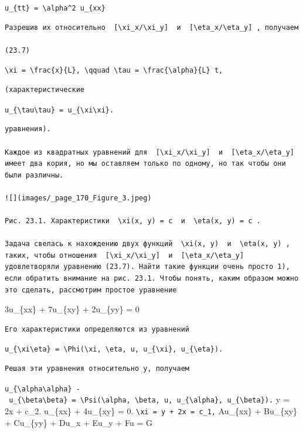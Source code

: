 \documentclass[
  ukrainian,
]{article}
\begin{document}
\texttt{u\_\{tt\}\ =\ \textbackslash{}alpha\^{}2\ u\_\{xx\}}

\begin{verbatim}
Разрешив их относительно  [\xi_x/\xi_y]  и  [\eta_x/\eta_y] , получаем

(23.7)
\end{verbatim}

\texttt{\textbackslash{}xi\ =\ \textbackslash{}frac\{x\}\{L\},\ \textbackslash{}qquad\ \textbackslash{}tau\ =\ \textbackslash{}frac\{\textbackslash{}alpha\}\{L\}\ t,}

\begin{verbatim}
(характеристические
\end{verbatim}

\texttt{u\_\{\textbackslash{}tau\textbackslash{}tau\}\ =\ u\_\{\textbackslash{}xi\textbackslash{}xi\}.}

\begin{verbatim}
уравнения).

Kaждое из квадратных уравнений для  [\xi_x/\xi_y]  и  [\eta_x/\eta_y]  имеет два кория, но мы оставляем только по одному, но так чтобы они были различны.

![](images/_page_170_Figure_3.jpeg)

Рис. 23.1. Характеристики  \xi(x, y) = c  и  \eta(x, y) = c .

Задача свелась к нахождению двух функций  \xi(x, y)  и  \eta(x, y) , таких, чтобы отношения  [\xi_x/\xi_y]  и  [\eta_x/\eta_y]  удовлетворяли уравнению (23.7). Найти такие функции очень просто 1), если обратить внимание на рис. 23.1. Чтобы понять, каким образом можно это сделать, рассмотрим простое уравнение
\end{verbatim}

3u\_\{xx\} + 7u\_\{xy\} + 2u\_\{yy\} = 0

\begin{verbatim}
Его характеристики определяются из уравнений
\end{verbatim}

\texttt{u\_\{\textbackslash{}xi\textbackslash{}eta\}\ =\ \textbackslash{}Phi(\textbackslash{}xi,\ \textbackslash{}eta,\ u,\ u\_\{\textbackslash{}xi\},\ u\_\{\textbackslash{}eta\}).}

\begin{verbatim}
Решая эти уравнения относительно у, получаем
\end{verbatim}

\texttt{u\_\{\textbackslash{}alpha\textbackslash{}alpha\}\ -\ u\_\{\textbackslash{}beta\textbackslash{}beta\}\ =\ \textbackslash{}Psi(\textbackslash{}alpha,\ \textbackslash{}beta,\ u,\ u\_\{\textbackslash{}alpha\},\ u\_\{\textbackslash{}beta\}).}
y = 2x + c\_2. u\_\{xx\} + 4u\_\{xy\} = 0.
\texttt{\textbackslash{}xi\ =\ y\ +\ 2x\ =\ c\_1,} Au\_\{xx\} +
Bu\_\{xy\} + Cu\_\{yy\} + Du\_x + Eu\_y + Fu = G
\end{document}
